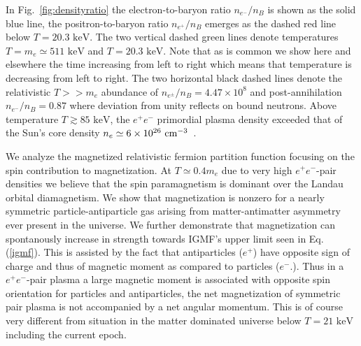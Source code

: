 \documentclass[a4paper]{article}
\newcommand*{\keV}{\text{ keV}}
\newcommand{\req}[1]{Eq.\,(\ref{#1})}
\newcommand{\rf}[1]{Fig.~{\ref{#1}}}
\begin{document}
In \rf{fig:densityratio} the electron-to-baryon ratio $n_{e^{-}}/n_{B}$ is shown as the solid blue line, the positron-to-baryon ratio $n_{e^{+}}/n_{B}$  emerges as the dashed red line below $T=20.3\keV$. The two vertical dashed green lines denote temperatures $T=m_{e}\simeq511\keV$ and $T=20.3\keV$. Note that as is common we show here and elsewhere the time increasing from left to right which means that temperature is decreasing from left to right. The two horizontal black dashed lines denote the relativistic $T>>m_e$ abundance of $n_{e^{\pm}}/n_{B}=4.47\times10^{8}$ and post-annihilation  $n_{e^{-}}/n_{B}=0.87$ where deviation from unity reflects on bound neutrons. Above temperature $T\gtrsim85\keV$, the $e^{+}e^{-}$ primordial plasma density exceeded that of the Sun's core density $n_{e}\simeq6\times10^{26}{\rm\ cm}^{-3}$~\cite{bahcall2001solar}. 

We analyze the magnetized relativistic fermion partition function focusing on the spin contribution to magnetization. At $T\simeq 0.4 m_e$ due to very high  $e^{+}e^{-}$-pair densities we believe that the spin paramagnetism is dominant over the Landau orbital diamagnetism. We show that magnetization is nonzero for a nearly symmetric particle-antiparticle gas arising from matter-antimatter asymmetry ever present in the universe. We further demonstrate that magnetization  can spontanously increase in strength towards IGMF's  upper limit  seen in \req{igmf}. This is assisted by the fact that antiparticles ($e^+$) have opposite sign of charge and thus of magnetic moment as compared to particles  ($e^-$.). Thus in a $e^{+}e^{-}$-pair  plasma a large magnetic moment is associated with opposite spin orientation for particles and antiparticles, the net magnetization of symmetric pair plasma is not accompanied by a net angular momentum. This is of course very different from situation in the matter dominated universe below $T=21\keV$ including the current epoch.

\end{document}

